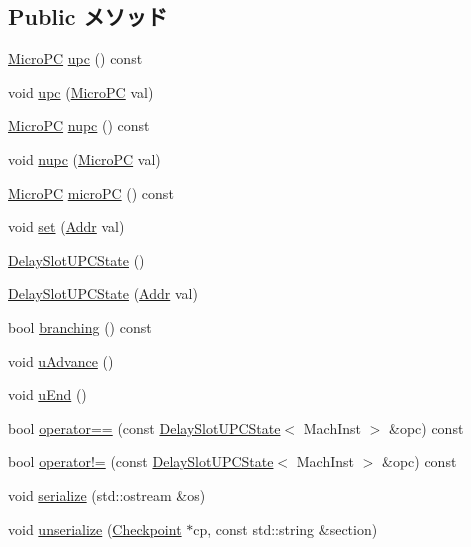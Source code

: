 \subsection*{Public メソッド}
\begin{DoxyCompactItemize}
\item 
\hyperlink{base_2types_8hh_adfb4d8b20c5abc8be73dd367b16f2d57}{MicroPC} \hyperlink{classGenericISA_1_1DelaySlotUPCState_a58857cf73ead03fe3a2e9ca79587f326}{upc} () const 
\item 
void \hyperlink{classGenericISA_1_1DelaySlotUPCState_ae13f8fb6bc07c4a7ac4af3496277000c}{upc} (\hyperlink{base_2types_8hh_adfb4d8b20c5abc8be73dd367b16f2d57}{MicroPC} val)
\item 
\hyperlink{base_2types_8hh_adfb4d8b20c5abc8be73dd367b16f2d57}{MicroPC} \hyperlink{classGenericISA_1_1DelaySlotUPCState_abc005b6462dcd78d9b0cfd3f0cfe3913}{nupc} () const 
\item 
void \hyperlink{classGenericISA_1_1DelaySlotUPCState_a58db0b2a7462cf953ace57aee78ac338}{nupc} (\hyperlink{base_2types_8hh_adfb4d8b20c5abc8be73dd367b16f2d57}{MicroPC} val)
\item 
\hyperlink{base_2types_8hh_adfb4d8b20c5abc8be73dd367b16f2d57}{MicroPC} \hyperlink{classGenericISA_1_1DelaySlotUPCState_a8f0ea0df7a63b5fbf898277c4d3a1268}{microPC} () const 
\item 
void \hyperlink{classGenericISA_1_1DelaySlotUPCState_a9a5b900e841dd75dc81970850547918f}{set} (\hyperlink{base_2types_8hh_af1bb03d6a4ee096394a6749f0a169232}{Addr} val)
\item 
\hyperlink{classGenericISA_1_1DelaySlotUPCState_a38dad47758e1c32d3018608a4c96794f}{DelaySlotUPCState} ()
\item 
\hyperlink{classGenericISA_1_1DelaySlotUPCState_a10590932636e8018f611b4152c461368}{DelaySlotUPCState} (\hyperlink{base_2types_8hh_af1bb03d6a4ee096394a6749f0a169232}{Addr} val)
\item 
bool \hyperlink{classGenericISA_1_1DelaySlotUPCState_ae3f0eb15a9382eefff6b00cf7999c2e3}{branching} () const 
\item 
void \hyperlink{classGenericISA_1_1DelaySlotUPCState_a5e17a0358d00a918a1b1b9beeed380d1}{uAdvance} ()
\item 
void \hyperlink{classGenericISA_1_1DelaySlotUPCState_a2f3cdfc88ed61928bd28242996e0f86e}{uEnd} ()
\item 
bool \hyperlink{classGenericISA_1_1DelaySlotUPCState_a3eaf06cc3c4e66eb1d29bafe9d140a8c}{operator==} (const \hyperlink{classGenericISA_1_1DelaySlotUPCState}{DelaySlotUPCState}$<$ MachInst $>$ \&opc) const 
\item 
bool \hyperlink{classGenericISA_1_1DelaySlotUPCState_a62dd495435f7d310779afd1c1a0b42c6}{operator!=} (const \hyperlink{classGenericISA_1_1DelaySlotUPCState}{DelaySlotUPCState}$<$ MachInst $>$ \&opc) const 
\item 
void \hyperlink{classGenericISA_1_1DelaySlotUPCState_a53e036786d17361be4c7320d39c99b84}{serialize} (std::ostream \&os)
\item 
void \hyperlink{classGenericISA_1_1DelaySlotUPCState_af22e5d6d660b97db37003ac61ac4ee49}{unserialize} (\hyperlink{classCheckpoint}{Checkpoint} $\ast$cp, const std::string \&section)
\end{DoxyCompactItemize}
